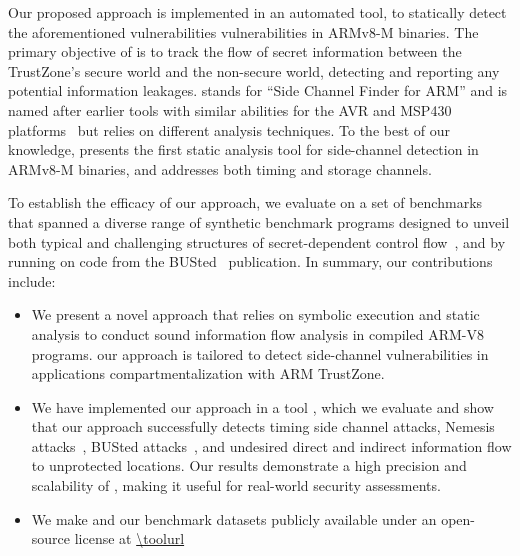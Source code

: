 Our proposed approach is implemented in an automated tool, \tool{} to
statically detect the aforementioned vulnerabilities vulnerabilities in
ARMv8-M binaries. The primary objective of \tool{} is to track the flow of
secret information between the TrustZone's secure world and the non-secure
world, detecting and reporting any potential information leakages. \tool{}
stands for ``Side Channel Finder for ARM'' and is named after earlier tools
with similar abilities for the AVR and MSP430 platforms~\cite{scfmsp,
MantelAVR} but relies on different analysis techniques.  To the best of our
knowledge, \tool{} presents the first static analysis tool for side-channel
detection in ARMv8-M binaries, and addresses both timing and storage
channels. 

To establish the efficacy of our approach, we evaluate \tool{} on a set of
benchmarks that spanned a diverse range of synthetic benchmark programs
designed to unveil both typical and challenging structures of
secret-dependent control flow~\cite{hans},
and by running \tool{} on code from the BUSted~\cite{busted} publication.
In summary, our contributions include:

\begin{itemize}
%
  \item{We present a novel approach that relies on symbolic execution and
static analysis to conduct sound information flow analysis in compiled
ARM-V8 programs. our approach is tailored to detect side-channel
vulnerabilities in applications compartmentalization with ARM TrustZone.}
%
  \item{We have implemented our approach in a tool \tool{}, which we
evaluate and show that our approach successfully detects  timing side
channel attacks, Nemesis attacks~\cite{Nemesis}, BUSted
attacks~\cite{busted}, and undesired direct and indirect information flow
to unprotected locations. Our results demonstrate a high precision and
scalability of \tool{}, making it useful for real-world security
assessments.}
%
  \item{We make \tool{} and our benchmark datasets publicly available under
an open-source license at \url{\toolurl}
%
}
%
\end{itemize}

